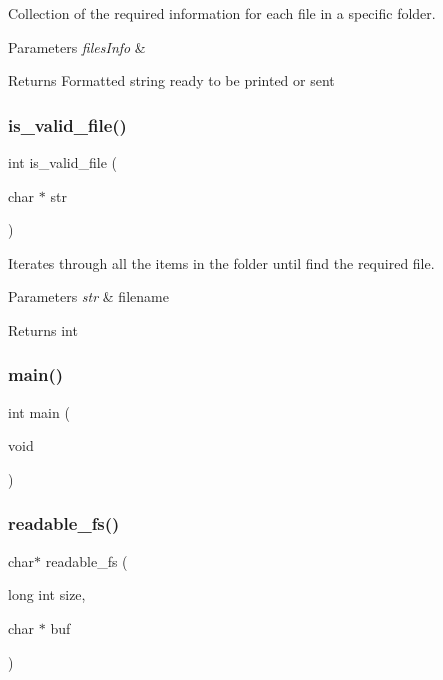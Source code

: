 Collection of the required information for each file in a specific folder. 


\begin{DoxyParams}{Parameters}
{\em files\+Info} & \\
\hline
\end{DoxyParams}
\begin{DoxyReturn}{Returns}
Formatted string ready to be printed or sent 
\end{DoxyReturn}
\mbox{\label{fileserv_8c_aaac1f10c2cd0525412fb92d9279b0670}} 
\subsubsection{is\+\_\+valid\+\_\+file()}
{\footnotesize\ttfamily int is\+\_\+valid\+\_\+file (\begin{DoxyParamCaption}\item[{char $\ast$}]{str }\end{DoxyParamCaption})}



Iterates through all the items in the folder until find the required file. 


\begin{DoxyParams}{Parameters}
{\em str} & filename \\
\hline
\end{DoxyParams}
\begin{DoxyReturn}{Returns}
int 
\end{DoxyReturn}
\mbox{\label{fileserv_8c_a840291bc02cba5474a4cb46a9b9566fe}} 
\subsubsection{main()}
{\footnotesize\ttfamily int main (\begin{DoxyParamCaption}\item[{void}]{ }\end{DoxyParamCaption})}

\mbox{\label{fileserv_8c_acb8985a720cf17b68e99872ba793f2cc}} 
\subsubsection{readable\+\_\+fs()}
{\footnotesize\ttfamily char$\ast$ readable\+\_\+fs (\begin{DoxyParamCaption}\item[{long int}]{size,  }\item[{char $\ast$}]{buf }\end{DoxyParamCaption})}



